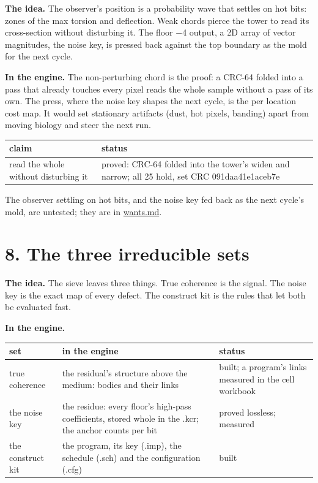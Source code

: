 \textbf{The idea.} The observer's position is a probability wave that settles on hot bits: zones of the max torsion and deflection. Weak chords pierce the tower to read its cross-section without disturbing it. The floor −4 output, a 2D array of vector magnitudes, the noise key, is pressed back against the top boundary as the mold for the next cycle.

\textbf{In the engine.} The non-perturbing chord is the proof: a CRC-64 folded into a pass that already touches every pixel reads the whole sample without a pass of its own. The press, where the noise key shapes the next cycle, is the per location cost map. It would set stationary artifacts (dust, hot pixels, banding) apart from moving biology and steer the next run.

{\small
\setlength{\tabcolsep}{6pt}
\begin{longtable}{>{\RaggedRight\arraybackslash}p{}>{\RaggedRight\arraybackslash}p{}}
\toprule
claim & status \\
\midrule
\endhead
read the whole without disturbing it & proved: CRC-64 folded into the tower's widen and narrow; all 25 hold, set CRC 091daa41e1aceb7e \\
\bottomrule
\end{longtable}
}

The observer settling on hot bits, and the noise key fed back as the next cycle's mold, are untested; they are in \hyperref[chap:wants]{wants.md}.

\section{\texorpdfstring{8. The three irreducible sets}{8. The three irreducible sets}}

\textbf{The idea.} The sieve leaves three things. True coherence is the signal. The noise key is the exact map of every defect. The construct kit is the rules that let both be evaluated fast.

\textbf{In the engine.}

{\small
\setlength{\tabcolsep}{6pt}
\begin{longtable}{>{\RaggedRight\arraybackslash}p{}>{\RaggedRight\arraybackslash}p{}>{\RaggedRight\arraybackslash}p{}}
\toprule
set & in the engine & status \\
\midrule
\endhead
true coherence & the residual's structure above the medium: bodies and their links & built; a program's links measured in the cell workbook \\
the noise key & the residue: every floor's high-pass coefficients, stored whole in the .kcr; the anchor counts per bit & proved lossless; measured \\
the construct kit & the program, its key (.imp), the schedule (.sch) and the configuration (.cfg) & built \\
\bottomrule
\end{longtable}
}

